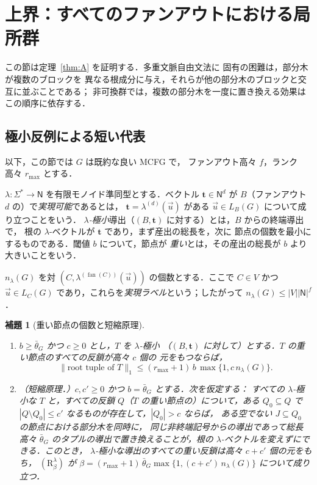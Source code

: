 \documentclass[11pt,a4paper]{ltjsarticle}
\numberwithin{equation}{section}
\theoremstyle{plain}
\newtheorem{lemma}[theorem]{補題}
\theoremstyle{definition}
\theoremstyle{remark}
\newcommand{\tuple}[1]{\vec{#1}}
\newcommand{\fan}{\operatorname{fan}}
\theoremstyle{plain}
\begin{document}
\section{上界：すべてのファンアウトにおける局所群}
\label{sec:upper}

この節は定理~\ref{thm:A} を証明する．多重文脈自由文法に
固有の困難は，部分木が複数のブロックを
異なる根成分に与え，それらが他の部分木のブロックと交互に並ぶことである；
非可換群では，複数の部分木を一度に置き換える効果は
この順序に依存する．

\subsection{極小反例による短い代表}
\label{subsec:group-invariants}

以下，この節では $G$ は既約な良い MCFG で，
ファンアウト高々 $f$，ランク高々 $r_{\max}$ とする．

$\lambda:\Sigma^*\to\mathsf N$ を有限モノイド準同型とする．ベクトル
$\mathbf t\in\mathsf N^d$ が $B$（ファンアウト $d$ の）で\emph{実現可能}であるとは，
$\mathbf t=\lambda^{(d)}(\tuple u)$ がある $\tuple u\in L_B(G)$ について成り立つことをいう．
\emph{$\lambda$-極小}導出（$(B,\mathbf t)$ に対する）とは，$B$ からの終端導出で，
根の $\lambda$-ベクトルが $\mathbf t$ であり，まず産出の総長を，次に
節点の個数を最小にするものである．閾値 $b$ について，節点が
\emph{重い}とは，その産出の総長が $b$ より大きいことをいう．

$n_\lambda(G)$ を対 $(C,\lambda^{(\fan(C))}(\tuple u))$ の個数とする．ここで $C\in V$ かつ
$\tuple u\in L_C(G)$ であり，これらを\emph{実現ラベル}という；したがって $n_\lambda(G)\le|V||\mathsf N|^f$．

\begin{lemma}[重い節点の個数と短縮原理]
\label{lem:heavy-node-count}
\begin{enumerate}[label=\textup{(\roman*)},leftmargin=*]
\item $b\ge\bar\theta_G$ かつ $c\ge0$ とし，$T$ を $\lambda$-極小
（$(B,\mathbf t)$ に対して）とする．$T$ の重い節点のすべての反鎖が高々 $c$ 個の
元をもつならば，
\[
 \|\text{root tuple of }T\|_1\le(r_{\max}+1)\,b\,\max\{1,c\,n_\lambda(G)\}.
\]
\item \emph{（短縮原理．）}$c,c'\ge0$ かつ $b=\bar\theta_G$ とする．次を仮定する：
すべての $\lambda$-極小な $T$ と，すべての反鎖 $Q$（$T$ の重い節点の）について，ある
$Q_0\subseteq Q$ で $|Q\setminus Q_0|\le c'$ なるものが存在して，$|Q_0|>c$ ならば，
ある空でない $J\subseteq Q_0$ の節点における部分木を同時に，
同じ非終端記号からの導出であって総長高々
$\bar\theta_G$ のタプルの導出で置き換えることが，根の $\lambda$-ベクトルを変えずにできる．このとき，
$\lambda$-極小な導出のすべての重い反鎖は高々 $c+c'$ 個の元をもち，
$(\mathrm R_\beta^\lambda)$ が
$\beta=(r_{\max}+1)\,\bar\theta_G\max\{1,(c+c')\,n_\lambda(G)\}$ について成り立つ．
\end{enumerate}
\end{lemma}
\end{document}
